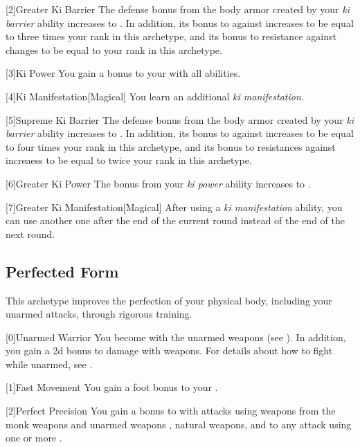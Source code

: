         [2]{Greater Ki Barrier} 
        The defense bonus from the body armor created by your \textit{ki barrier} ability increases to .
        In addition, its bonus to  against  increases to be equal to three times your rank in this archetype, and its bonus to resistance against  changes to be equal to your rank in this archetype.

        [3]{Ki Power}
        You gain a  bonus to your  with all abilities.

        [4]{Ki Manifestation}[Magical]
        You learn an additional \textit{ki manifestation}.

        [5]{Supreme Ki Barrier}
        The defense bonus from the body armor created by your \textit{ki barrier} ability increases to .
        In addition, its bonus to  against  increases to be equal to four times your rank in this archetype, and its bonus to resistances against  increaess to be equal to twice your rank in this archetype.

        [6]{Greater Ki Power} The bonus from your \textit{ki power} ability increases to .

        [7]{Greater Ki Manifestation}[Magical] After using a \textit{ki manifestation} ability, you can use another one after the end of the current round instead of the end of the next round.

    \newpage
    \subsection{Perfected Form}
        This archetype improves the perfection of your physical body, including your unarmed attacks, through rigorous training.

        [0]{Unarmed Warrior} You become  with the unarmed weapons  (see ).
        In addition, you gain a \plus2d bonus to damage with  weapons.
        For details about how to fight while unarmed, see .

        [1]{Fast Movement} You gain a  foot bonus to your .

        [2]{Perfect Precision} You gain a  bonus to  with attacks using weapons from the monk weapons and unarmed weapons , natural weapons, and to any attack using one or more .

